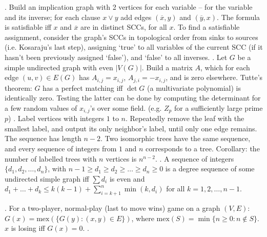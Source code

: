 . Build an implication graph with 2 vertices for each
variable -- for the variable and its inverse; for each clause $x \lor y$
add edges $({\overline x}, y)$ and $({\overline y}, x)$.
The formula is satisfiable iff $x$ and ${\overline x}$ are in distinct SCCs,
for all $x$. To find a satisfiable assignment, consider the graph's SCCs
in topological order from sinks to sources (i.e. Kosaraju's last step), assigning `true' to
all variables of the current SCC (if it hasn't been previously
assigned `false'), and `false' to all inverses. \TopicBreak
{}.
Let $G$ be a simple undirected graph with even $|V(G)|$.
Build a matrix $A$, which for each edge $(u,v) \in E(G)$ has
$A_{i,j}=x_{i,j}$, $A_{j,i}=-x_{i,j}$, and is zero elsewhere.
Tutte's theorem: $G$ has a perfect matching iff $\det G$ (a multivariate
polynomial) is identically zero.
Testing the latter can be done by computing the determinant for
a few random values of $x_{i,j}$'s over some field.
(e.g. $Z_p$ for a sufficiently large prime $p$) \TopicBreak
{}.
Label vertices with integers $1$ to $n$.
Repeatedly remove the leaf with the smallest label, and output its only
neighbor's label, until only one edge remains. The sequence has
length $n-2$.  Two isomorphic trees have the same sequence, and every sequence
of integers from $1$ and $n$ corresponds to a tree.
Corollary: the number of labelled trees with $n$ vertices is $n^{n-2}$. \TopicBreak %
.
A sequence of integers $\{ d_1, d_2, \dots, d_n \}$,
with $n-1 \ge d_1 \ge d_2 \ge \dots \ge d_n \ge 0$ is a degree sequence
of some undirected simple graph iff $\sum d_i$ is even and
$d_1 + \dots + d_k \le k(k-1) + \sum_{i=k+1}^n \min(k, d_{i})$
for all $k=1,2,\dots,n-1$.




.
For a two-player, normal-play (last to move wins) game on a graph $(V,E)$:
$G(x) = \mbox{mex}(\{ G(y) : (x, y) \in E \})$,
where $\mbox{mex}(S) = \min \{ n \ge 0: n \not\in S \}$.
$x$ is losing iff $G(x) = 0$. \TopicBreak
{}.

